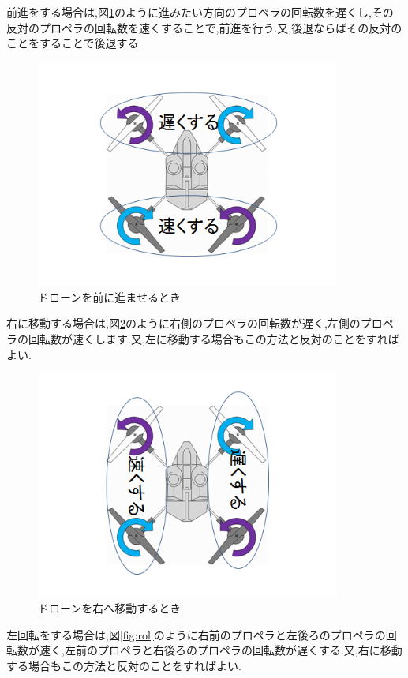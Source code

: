 \documentclass[12pt,oneside]{paper}
\begin{document}
前進をする場合は,図\ref{fig:zen}のように進みたい方向のプロペラの回転数を遅くし,その反対のプロペラの回転数を速くすることで,前進を行う.又,後退ならばその反対のことをすることで後退する.

\begin{figure}[H]
  \begin{center}
    \includegraphics[width=100mm]{ga/zen.png}
    \end{center}
  \caption{ドローンを前に進ませるとき}
 \label{fig:zen}
\end{figure}

右に移動する場合は,図\ref{fig:rig}のように右側のプロペラの回転数が遅く,左側のプロペラの回転数が速くします.又,左に移動する場合もこの方法と反対のことをすればよい.

\begin{figure}[H]
  \begin{center}
    \includegraphics[width=100mm]{ga/rig.png}
    \end{center}
  \caption{ドローンを右へ移動するとき}
 \label{fig:rig}
\end{figure}

左回転をする場合は,図\ref{fig:rol}のように右前のプロペラと左後ろのプロペラの回転数が速く,左前のプロペラと右後ろのプロペラの回転数が遅くする.又,右に移動する場合もこの方法と反対のことをすればよい.
\end{document}
